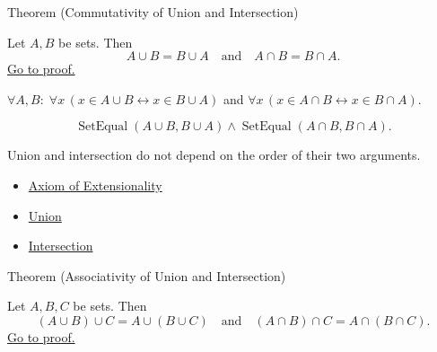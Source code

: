 \begin{theorembox}{Theorem (Commutativity of Union and Intersection)}
\begin{theorem}\label{thm:commutativity}
Let $A,B$ be sets. Then
\[
A \cup B = B \cup A
\quad\text{and}\quad
A \cap B = B \cap A.
\]
\hyperref[prf:commutativity]{Go to proof.}
\end{theorem}
\end{theorembox}

\begin{remark*}
$\forall A, B:\; \forall x\,(x \in A \cup B \leftrightarrow x \in B \cup A)$ and $\forall x\,(x \in A \cap B \leftrightarrow x \in B \cap A)$.
\end{remark*}

\begin{remark*}
\[
  \operatorname{SetEqual}(A\cup B,B\cup A)
  \wedge
  \operatorname{SetEqual}(A\cap B,B\cap A).
\]
\end{remark*}

\begin{remark*}[Interpretation]
Union and intersection do not depend on the order of their two arguments.
\end{remark*}


\begin{dependencies}
\begin{itemize}
  \item \hyperref[ax:extensionality]{Axiom of Extensionality}
  \item \hyperref[def:union]{Union}
  \item \hyperref[def:intersection]{Intersection}
\end{itemize}
\end{dependencies}

\begin{theorembox}{Theorem (Associativity of Union and Intersection)}
\begin{theorem}\label{thm:associativity}
Let $A,B,C$ be sets. Then
\[
(A \cup B) \cup C = A \cup (B \cup C)
\quad\text{and}\quad
(A \cap B) \cap C = A \cap (B \cap C).
\]
\hyperref[prf:associativity]{Go to proof.}
\end{theorem}
\end{theorembox}

